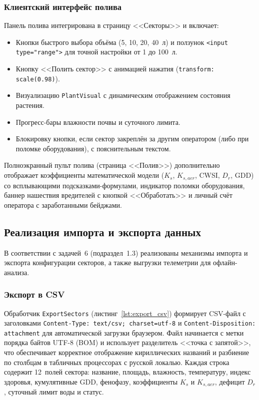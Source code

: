 \subsubsection{Клиентский интерфейс полива}

Панель полива интегрирована в страницу <<Секторы>> и
включает:
\begin{itemize}
    \item Кнопки быстрого выбора объёма (5, 10, 20, 40~л)
    и ползунок \texttt{<input type="range">} для точной
    настройки от 1 до 100~л.
    \item Кнопку <<Полить сектор>> с анимацией нажатия
    (\texttt{transform: scale(0.98)}).
    \item Визуализацию \texttt{PlantVisual} с динамическим
    отображением состояния растения.
    \item Прогресс-бары влажности почвы и суточного лимита.
    \item Блокировку кнопки, если сектор закреплён за другим
    оператором (либо при поломке оборудования), с
    пояснительным текстом.
\end{itemize}

Полноэкранный пульт полива (страница <<Полив>>) дополнительно
отображает коэффициенты математической модели ($K_s$,
$K_{s,aer}$, CWSI, $D_r$, GDD) со всплывающими
подсказками-формулами, индикатор поломки оборудования,
баннер нашествия вредителей с кнопкой <<Обработать>> и
личный счёт оператора с заработанными бейджами.


\subsection{Реализация импорта и экспорта данных}

В соответствии с задачей~6 (подраздел~1.3) реализованы
механизмы импорта и экспорта конфигурации секторов, а также
выгрузки телеметрии для офлайн-анализа.

\subsubsection{Экспорт в CSV}

Обработчик \texttt{ExportSectors}
(листинг~\ref{lst:export_csv}) формирует CSV-файл с
заголовками \texttt{Content-Type: text/csv; charset=utf-8} и
\texttt{Content-Disposition: attachment} для автоматической
загрузки браузером. Файл начинается с метки порядка байтов
UTF-8 (BOM) и использует разделитель <<точка с запятой>>,
что обеспечивает корректное отображение кириллических
названий и разбиение по столбцам в табличных процессорах
с русской локалью. Каждая строка содержит 12~полей сектора:
название, площадь, влажность, температуру, индекс здоровья,
кумулятивные GDD, фенофазу, коэффициенты $K_s$ и $K_{s,aer}$,
дефицит $D_r$, суточный лимит воды и статус.

